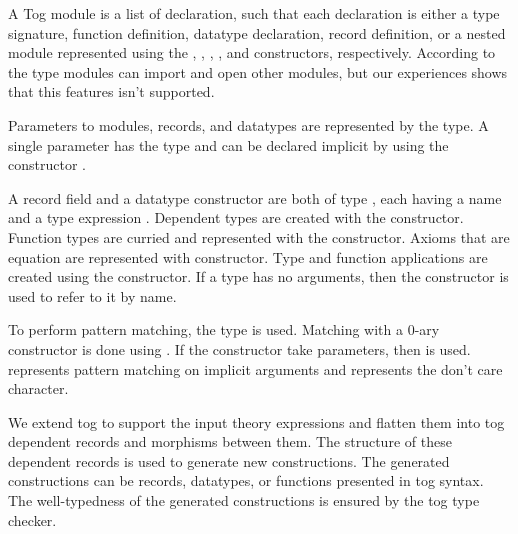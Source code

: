 A Tog module is a list of declaration, such that each declaration is either a type signature, function definition, datatype declaration, record definition, or a nested module represented using the  , , , , and  constructors, respectively. 
According to the type  modules can import and open other modules, but our experiences shows that this features isn't supported. 

Parameters to modules, records, and datatypes are represented by the  type. A single parameter has the type  and can be declared implicit by using the constructor . 

A record field and a datatype constructor are both of type , each having a name and a type expression . Dependent types are created with the  constructor. Function types are curried and represented with the  constructor. Axioms that are equation are represented with  constructor. Type and function applications are created using the  constructor. If a type has no arguments, then the  constructor is used to refer to it by name. 

To perform pattern matching, the  type is used. Matching with a $0$-ary constructor is done using . If the constructor take parameters, then  is used.  represents pattern matching on implicit arguments and  represents the don't care \lstmath{$\_$} character. 

We extend tog to support the input theory expressions and flatten them into tog dependent records and morphisms between them. 
The structure of these dependent records is used to generate new constructions. The generated constructions can be records, datatypes, or functions presented in tog syntax. The well-typedness of the generated constructions is ensured by the tog type checker. 


